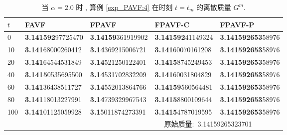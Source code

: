 \begin{table}[H]\footnotesize
	\centering
	\caption{当 $\alpha=2.0$ 时 , 算例 \ref{exp_PAVF:4}  在时刻 $t=t_{m}$ 的离散质量 $G^{m}$.}
	
	\begin{tabular}{p{0.7cm}p{3cm}p{3cm}p{3cm}p{3cm}}
	  \toprule
$t$   &FAVF   &FPAVF   &FPAVF-C   &FPAVF-P\\
	\midrule
	0     & \textbf{3.141592}97725470 & \textbf{3.14159}361919902 & \textbf{3.141592}41149324 & \textbf{3.141592653}58976 \\
	10    & \textbf{3.141}68000260412 & \textbf{3.14}369215006721 & \textbf{3.141}60070161208 & \textbf{3.141592653}58976 \\
	20    & \textbf{3.141}64544531849 & \textbf{3.14}521250122401 & \textbf{3.1415}8745249453 & \textbf{3.141592653}58976 \\
	40    & \textbf{3.1415}0535695500 & \textbf{3.14}531702832209 & \textbf{3.141}60031804829 & \textbf{3.141592653}58976 \\
	60    & \textbf{3.141}36438511727 & \textbf{3.14}552013864766 & \textbf{3.14159}560564481 & \textbf{3.141592653}58976 \\
	80    & \textbf{3.141}18013227991 & \textbf{3.14}739329967543 & \textbf{3.1415}8800109644 & \textbf{3.141592653}58976 \\
	100   & \textbf{3.141}01125059928 & \textbf{3.1}5011874273391 & \textbf{3.1415}4787019595 & \textbf{3.141592653}58976 \\
	\midrule
	  \multicolumn{5}{r}{原始质量:~3.14159265323701~~~~~~~~} \\
	  \bottomrule
	  \end{tabular}\label{tab_PAVF:4-4}%
  \end{table}%
  
